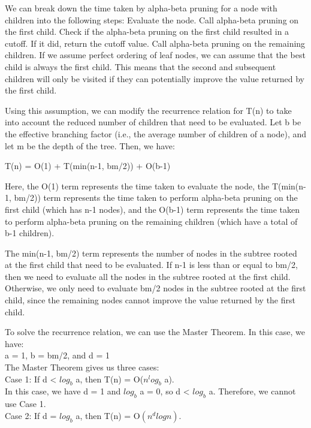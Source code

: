 \documentclass[15pt,journal]{IEEEtran}
\begin{document}
We can break down the time taken by alpha-beta pruning for a node with children into the following steps:
\cite{mausam}
Evaluate the node.
Call alpha-beta pruning on the first child.
Check if the alpha-beta pruning on the first child resulted in a cutoff. If it did, return the cutoff value.
Call alpha-beta pruning on the remaining children.
If we assume perfect ordering of leaf nodes, we can assume that the best child is always the first child. This means that the second and subsequent children will only be visited if they can potentially improve the value returned by the first child.

Using this assumption, we can modify the recurrence relation for T(n) to take into account the reduced number of children that need to be evaluated. Let b be the effective branching factor (i.e., the average number of children of a node), and let m be the depth of the tree. Then, we have:

T(n) = O(1) + T(min(n-1, bm/2)) + O(b-1)

Here, the O(1) term represents the time taken to evaluate the node, the T(min(n-1, bm/2)) term represents the time taken to perform alpha-beta pruning on the first child (which has n-1 nodes), and the O(b-1) term represents the time taken to perform alpha-beta pruning on the remaining children (which have a total of b-1 children).

The min(n-1, bm/2) term represents the number of nodes in the subtree rooted at the first child that need to be evaluated. If n-1 is less than or equal to bm/2, then we need to evaluate all the nodes in the subtree rooted at the first child. Otherwise, we only need to evaluate bm/2 nodes in the subtree rooted at the first child, since the remaining nodes cannot improve the value returned by the first child.

To solve the recurrence relation, we can use the Master Theorem. In this case, we have:\\

a = 1, b = bm/2, and d = 1\\

The Master Theorem gives us three cases:\\

Case 1: If d < $log_b$ a, then T(n) = O($n^log_b$ a).\\

In this case, we have d = 1 and $log_b$ a = 0, so d < $log_b$ a. Therefore, we cannot use Case 1.\\

Case 2: If d = $log_b$ a, then T(n) = O$(n^d log n)$.\\
\end{document}
